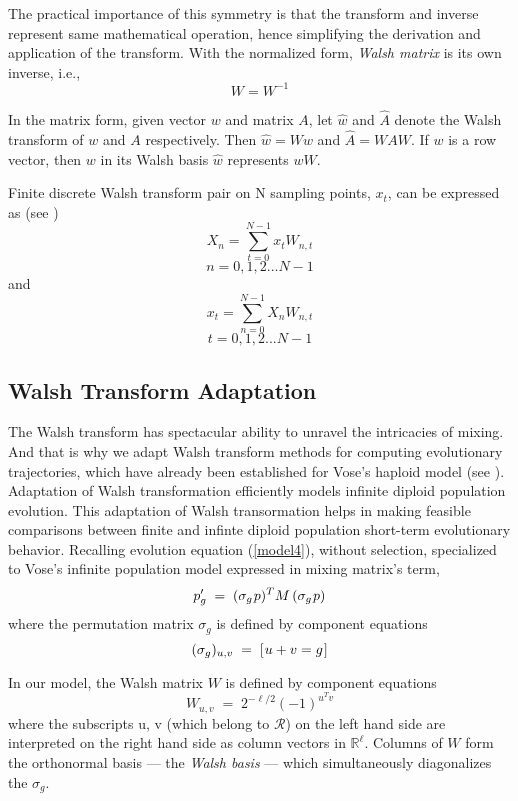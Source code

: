 The practical importance of this symmetry is that the transform and inverse represent same mathematical operation, hence simplifying the derivation and application of the transform. With the normalized form, \textit{Walsh matrix} is its own inverse, i.e.,
\[
W = W^{-1}
\]

In the matrix form, given vector $w$ and matrix $A$, let $\widehat{w}$ and
$\widehat{A}$ denote the Walsh transform of $w$ and $A$ respectively. Then $\widehat{w} = Ww$ and
$\widehat{A} = WAW$. If $w$ is a row vector, then $w$ in its Walsh basis $\widehat{w}$ represents $wW$.

Finite discrete Walsh transform pair on N sampling points, $x_t$, can be expressed as (see \cite{Beauchamp1975} )
\begin{equation}
\label{WalshT}
X_n = \sum_{t=0}^{N-1} x_t W_{n,t}
\end{equation}
\[
n = 0, 1, 2...N-1
\]
and
\[
x_t = \sum_{n=0}^{N-1} X_n W_{n,t}
\]
\[
t = 0, 1, 2...N-1
\]

\subsection{Walsh Transform Adaptation}
The Walsh transform has spectacular ability to unravel the intricacies of mixing. And that is why we adapt Walsh transform methods for computing evolutionary trajectories, which have already been established for Vose's haploid model (see \cite{VoseWright1998}). Adaptation of Walsh transformation efficiently models infinite diploid population evolution. This adaptation of Walsh transormation helps in making feasible comparisons between finite and infinte diploid population short-term evolutionary behavior.
Recalling evolution equation (\ref{model4}), without selection, specialized to Vose's infinite population model expressed in mixing matrix's term,
\[
p_g^\prime \; = \; (\sigma_g \hspace{0.01in} p)^T M \, (\sigma_g \hspace{0.01in} p)
\]
where the permutation matrix $\sigma_g$ is defined by component
equations
\[
(\sigma_g)_{u,v} \; = \; [\hspace{0.01in} u+v = g\hspace{0.01in} ]
\]

In our model, the Walsh matrix $W$
is defined by component equations
\[
W_{u,v} \; = \; 2^{-\ell/2} (-1)^{u^T v}
\]
where the subscripts \nudge u, \nudge v (which belong to $\mathcal{R}$) on the left hand side are interpreted on the right hand side as column vectors in $\mathbb{R}^{\ell}$.
Columns of $W$ form the orthonormal basis --- the
{\em Walsh basis\/} --- which simultaneously diagonalizes the
$\sigma_g$.

